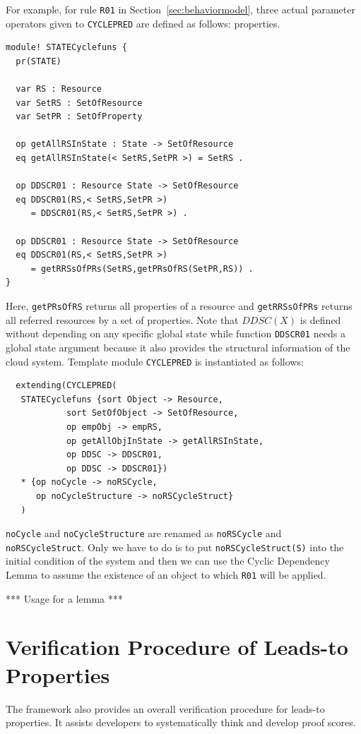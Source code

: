 \documentclass[12pt]{report}
\newcommand{\stt}[1]{{\small{\tt {#1}}}}
\begin{document}
For example, for rule {\tt R01} in Section~\ref{sec:behaviormodel},
three actual parameter operators given to {\tt CYCLEPRED} are defined
as follows: properties.
\begin{verbatim}
module! STATECyclefuns {
  pr(STATE)

  var RS : Resource
  var SetRS : SetOfResource
  var SetPR : SetOfProperty

  op getAllRSInState : State -> SetOfResource
  eq getAllRSInState(< SetRS,SetPR >) = SetRS .

  op DDSCR01 : Resource State -> SetOfResource
  eq DDSCR01(RS,< SetRS,SetPR >)
     = DDSCR01(RS,< SetRS,SetPR >) .

  op DDSCR01 : Resource State -> SetOfResource
  eq DDSCR01(RS,< SetRS,SetPR >)
     = getRRSsOfPRs(SetRS,getPRsOfRS(SetPR,RS)) .
}
\end{verbatim}
Here, {\tt getPRsOfRS} returns all properties of a resource and
{\tt getRRSsOfPRs} returns all referred resources by a set of
properties.  Note that $DDSC(X)$ is defined without depending on any
specific global state while function {\tt DDSCR01} needs a global state
argument because it also provides the structural information of the
cloud system. Template module {\tt CYCLEPRED} is instantiated as follows:
\begin{verbatim}
  extending(CYCLEPRED(
   STATECyclefuns {sort Object -> Resource,
            sort SetOfObject -> SetOfResource,
            op empObj -> empRS,
            op getAllObjInState -> getAllRSInState,
            op DDSC -> DDSCR01,
            op DDSC -> DDSCR01})
   * {op noCycle -> noRSCycle,
      op noCycleStructure -> noRSCycleStruct}
   )
\end{verbatim}
{\tt noCycle} and {\tt noCycleStructure} are renamed as
{\tt noRSCycle} and {\tt noRSCycleStruct}. Only we have to do is to
put \stt{noRSCycleStruct(S)} into the initial condition of the system
and then we can use the Cyclic Dependency Lemma to assume the
existence of an object to which {\tt R01} will be applied.

*** Usage for a lemma ***

\chapter{Verification Procedure of Leads-to Properties}
\label{chap:verification}
The framework also provides an overall verification procedure for
leads-to properties. It assists developers to systematically think and
develop proof scores.
\end{document}
